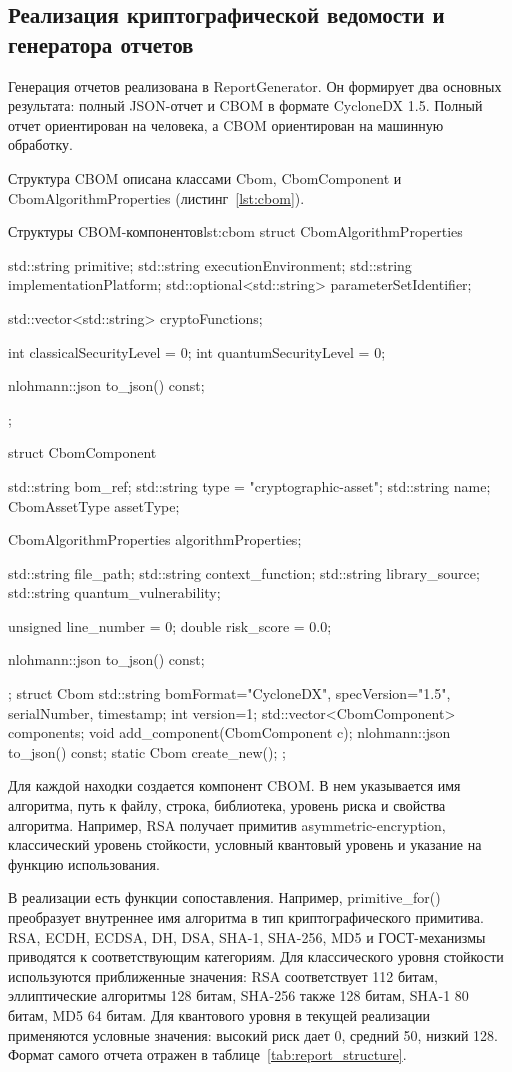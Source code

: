 \documentclass{itmo-vkr}
\begin{document}
\subsection{Реализация криптографической ведомости и генератора отчетов}

Генерация отчетов реализована в ReportGenerator. Он формирует два основных результата: полный JSON-отчет и CBOM в формате CycloneDX 1.5. Полный отчет ориентирован на человека, а CBOM ориентирован на машинную обработку.

Структура CBOM описана классами Cbom, CbomComponent и CbomAlgorithmProperties (листинг~\ref{lst:cbom}).

\begin{itmolisting}[C++]{Структуры CBOM-компонентов}{lst:cbom}
struct CbomAlgorithmProperties {
	std::string primitive;
	std::string executionEnvironment;
	std::string implementationPlatform;
	std::optional<std::string> parameterSetIdentifier;
	
	std::vector<std::string> cryptoFunctions;
	
	int classicalSecurityLevel = 0;
	int quantumSecurityLevel = 0;
	
	nlohmann::json to_json() const;
};

struct CbomComponent {
	std::string bom_ref;
	std::string type = "cryptographic-asset";
	std::string name;
	CbomAssetType assetType;
	
	CbomAlgorithmProperties algorithmProperties;
	
	std::string file_path;
	std::string context_function;
	std::string library_source;
	std::string quantum_vulnerability;
	
	unsigned line_number = 0;
	double risk_score = 0.0;
	
	nlohmann::json to_json() const;
};
struct Cbom {
	std::string bomFormat="CycloneDX", specVersion="1.5", serialNumber, timestamp;
	int version=1;
	std::vector<CbomComponent> components;
	void add_component(CbomComponent c);
	nlohmann::json to_json() const;
	static Cbom create_new();
};
\end{itmolisting}

Для каждой находки создается компонент CBOM. В нем указывается имя алгоритма, путь к файлу, строка, библиотека, уровень риска и свойства алгоритма. Например, RSA получает примитив asymmetric-encryption, классический уровень стойкости, условный квантовый уровень и указание на функцию использования.

В реализации есть функции сопоставления. Например, primitive\_for() преобразует внутреннее имя алгоритма в тип криптографического примитива. RSA, ECDH, ECDSA, DH, DSA, SHA-1, SHA-256, MD5 и ГОСТ-механизмы приводятся к соответствующим категориям. Для классического уровня стойкости используются приближенные значения: RSA соответствует 112 битам, эллиптические алгоритмы 128 битам, SHA-256 также 128 битам, SHA-1 80 битам, MD5 64 битам. Для квантового уровня в текущей реализации применяются условные значения: высокий риск дает 0, средний 50, низкий 128. Формат самого отчета отражен в таблице~\ref{tab:report_structure}.
\end{document}
